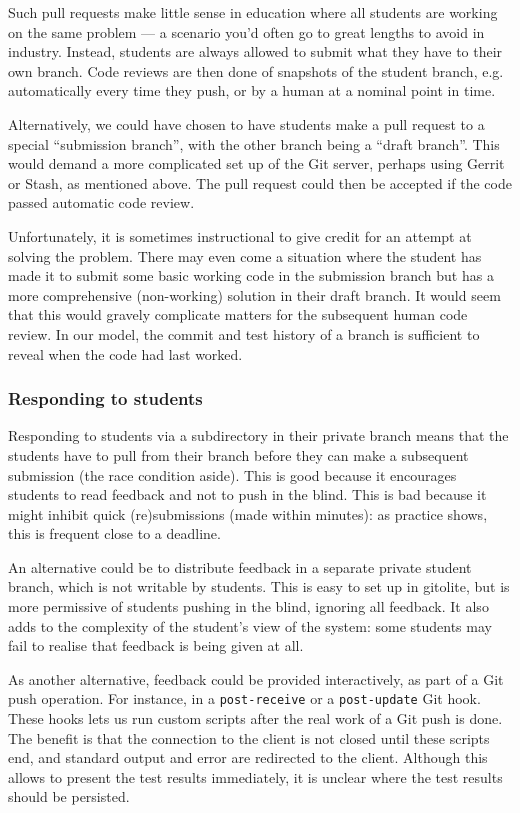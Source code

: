 Such pull requests make little sense in education where all students are
working on the same problem --- a scenario you'd often go to great lengths to
avoid in industry. Instead, students are always allowed to submit what they
have to their own branch. Code reviews are then done of snapshots of the
student branch, e.g. automatically every time they push, or by a human at a
nominal point in time.

Alternatively, we could have chosen to have students make a pull request to a
special ``submission branch'', with the other branch being a ``draft branch''.
This would demand a more complicated set up of the Git server, perhaps using
Gerrit or Stash, as mentioned above. The pull request could then be accepted
if the code passed automatic code review.

Unfortunately, it is sometimes instructional to give credit for an attempt at
solving the problem. There may even come a situation where the student has made
it to submit some basic working code in the submission branch but has a more
comprehensive (non-working) solution in their draft branch. It would seem that
this would gravely complicate matters for the subsequent human code review. In
our model, the commit and test history of a branch is sufficient to reveal when
the code had last worked.

\subsubsection{Responding to students}

Responding to students via a subdirectory in their private branch means that
the students have to pull from their branch before they can make a subsequent
submission (the race condition aside). This is good because it encourages
students to read feedback and not to push in the blind. This is bad because it
might inhibit quick (re)submissions (made within minutes): as practice shows,
this is frequent close to a deadline.

An alternative could be to distribute feedback in a separate private student
branch, which is not writable by students. This is easy to set up in gitolite,
but is more permissive of students pushing in the blind, ignoring all feedback.
It also adds to the complexity of the student's view of the system: some
students may fail to realise that feedback is being given at all.

As another alternative, feedback could be provided interactively, as part of a
Git push operation. For instance, in a \texttt{post-receive} or a
\texttt{post-update} Git hook. These hooks lets us run custom scripts after the
real work of a Git push is done. The benefit is that the connection to the
client is not closed until these scripts end, and standard output and error are
redirected to the client\cite{man-5-githooks}. Although this allows to present
the test results immediately, it is unclear where the test results should be
persisted.

